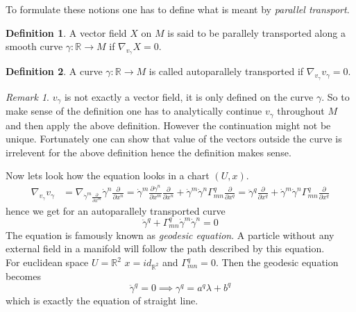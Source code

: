 \documentclass[a4paper]{report}
\theoremstyle{definition}
\newtheorem{definition}{Definition}[section]
\theoremstyle{remark}
\newtheorem*{remark}{Remark}
\begin{document}
		To formulate these notions one has to define what is meant by \emph{parallel transport}.
		\begin{definition} 
			A vector field $X$ on $M$ is said to be parallely transported along a smooth curve $\gamma : \mathbb{R} \rightarrow M$ if $\nabla_{v_\gamma}X = 0$.
		\end{definition}
		\begin{definition}
			A curve $\gamma : \mathbb{R} \rightarrow M$ is called autoparallely transported if $\nabla_{v_\gamma}v_\gamma = 0$.
		\end{definition}
		\begin{remark}
			$v_\gamma$ is not exactly a vector field, it is only defined on the curve $\gamma$. So to make sense of the definition one has to analytically continue $v_\gamma$ throughout $M$ and then apply the above definition. However the continuation might not be unique. Fortunately one can show that value of the vectors outside the curve is irrelevent for the above definition hence the definition makes sense.
		\end{remark}
		Now lets look how the equation looks in a chart $(U,x)$.
		\begin{equation*}
			\begin{split}
				\nabla_{v_\gamma}v_\gamma &= \nabla_{\dot{\gamma}^{m}\tfrac{\partial}{\partial x^m}}\dot{\gamma}^{n}\tfrac{\partial}{\partial x^n}
				= \dot{\gamma}^m \tfrac{\partial \dot{\gamma}^{n}}{\partial x^m}\tfrac{\partial}{\partial x^n} + \dot{\gamma}^{m}\dot{\gamma}^{n}\Gamma_{mn}^{q}\tfrac{\partial}{\partial x^q}
				=\ddot{\gamma}^{q}\tfrac{\partial}{\partial x^q} + \dot{\gamma}^{m}\dot{\gamma}^{n}\Gamma_{mn}^{q}\tfrac{\partial}{\partial x^q}
			\end{split}
		\end{equation*}
		hence we get for an autoparallely transported curve
		\begin{equation*}
			\ddot{\gamma}^{q} + \Gamma_{mn}^{q}\dot{\gamma}^{m}\dot{\gamma}^{n} = 0
		\end{equation*}
		The equation is famously known as \emph{geodesic equation}. A particle without any external field in a manifold will follow the path described by this equation. \\ 
		For euclidean space $U = \mathbb{R}^2$ $x = id_{\mathbb{R}^2}$ and $\Gamma_{mn}^{q} = 0$. Then the geodesic equation becomes 
		\begin{equation*}
			\ddot{\gamma}^q = 0 \implies \gamma^q = a^q\lambda + b^q
		\end{equation*}
		which is exactly the equation of straight line.
\end{document}
